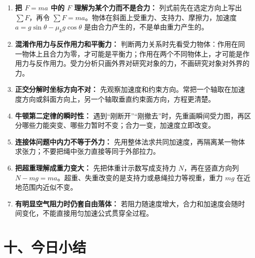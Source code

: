 \begin{mistakebox}
\begin{enumerate}
  \item \textbf{把 $F = ma$ 中的 $F$ 理解为某个力而不是合力：} 列式前先在选定方向上写出 $\sum F$，再令 $\sum F=ma$。物体在斜面上受重力、支持力、摩擦力，加速度 $a = g\sin\theta - \mu_k g\cos\theta$ 是由合力产生的，不是单由重力产生的。

  \item \textbf{混淆作用力与反作用力和平衡力：} 判断两力关系时先看受力物体：作用在同一物体上且合力为零，才可能是平衡力；作用在两个不同物体上，才可能是作用力与反作用力。受力分析只画外界对研究对象的力，不画研究对象对外界的力。

  \item \textbf{正交分解时坐标方向不对：} 先观察加速度和约束方向。常把一个轴取在加速度方向或斜面方向上，另一个轴取垂直约束面方向，方程更清楚。

  \item \textbf{牛顿第二定律的瞬时性：} 遇到“刚断开”“刚撤去”时，先重画瞬间受力图，再区分哪些力能突变、哪些力暂时不变；合力一变，加速度立即改变。

  \item \textbf{连接体问题中内力不等于外力：} 先用整体法求共同加速度，再隔离某一物体求张力；不要把绳中张力直接等同于外部拉力。

  \item \textbf{把超重理解成重力变大：} 先把体重计示数写成支持力 $N$，再在竖直方向列 $N-mg=ma$。超重、失重改变的是支持力或悬绳拉力等视重，重力 $mg$ 在近地范围内近似不变。

  \item \textbf{有明显空气阻力时仍套自由落体：} 若阻力随速度增大，合力和加速度会随时间变化，不能直接用匀加速公式贯穿全过程。
\end{enumerate}
\end{mistakebox}

\section*{十、今日小结}


